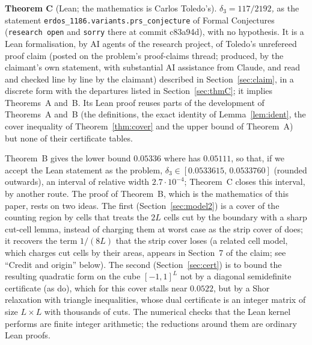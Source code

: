 \documentclass[11pt]{amsart}
\theoremstyle{remark}
\begin{document}
\medskip\noindent\textbf{Theorem C} (Lean; the mathematics is Carlos Toledo's). \emph{$\delta_3=117/2192$,} as the statement \texttt{erdos\_1186.variants.prs\_conjecture} of Formal Conjectures \cite{FC} (\texttt{research open} and \texttt{sorry} there at commit c83a94d), with no hypothesis. It is a Lean formalisation, by AI agents of the research project, of Toledo's unrefereed proof claim \cite{Toledo26} (posted on the problem's proof-claims thread; produced, by the claimant's own statement, with substantial AI assistance from Claude, and read and checked line by line by the claimant) described in Section~\ref{sec:claim}, in a discrete form with the departures listed in Section~\ref{sec:thmC}; it implies Theorems~A and~B. Its Lean proof reuses parts of the development of Theorems~A and~B (the definitions, the exact identity of Lemma~\ref{lem:ident}, the cover inequality of Theorem~\ref{thm:cover} and the upper bound of Theorem~A) but none of their certificate tables.

\medskip
Theorem~B gives the lower bound $0.05336$ where \cite{PRS08} has $0.05111$, so that, if we accept the Lean statement as the
problem, $\delta_3\in[0.0533615,\,0.0533760]$ (rounded outwards), an interval of relative width $2.7\cdot10^{-4}$; Theorem~C closes this interval, by another route. The proof of Theorem~B, which is the mathematics of this paper, rests on two ideas. The first (Section~\ref{sec:model2}) is a
cover of the counting region by cells that treats the $2L$ cells cut by the boundary with a sharp cut-cell lemma, instead of charging them at worst case as the
strip cover of \cite{PRS08} does; it recovers the term $1/(8L)$ that the strip cover loses (a related cell model, which charges cut cells by their areas, appears in Section~7 of the claim; see ``Credit and origin'' below). The second (Section~\ref{sec:cert}) is to
bound the resulting quadratic form on the cube $[-1,1]^L$ not by a diagonal semidefinite certificate (as \cite{PRS08} do), which for this
cover stalls near $0.0522$, but by a Shor relaxation with triangle inequalities, whose dual certificate is an integer matrix of size
$L\times L$ with thousands of cuts. The numerical checks that the Lean kernel performs are finite integer arithmetic; the reductions around them are ordinary Lean proofs.
\end{document}
